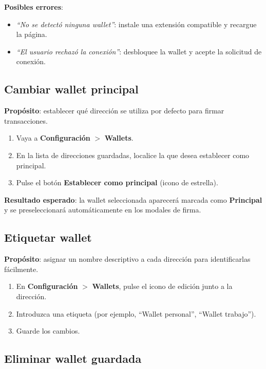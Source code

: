 \documentclass[11pt, a4paper]{article}
\begin{document}
\textbf{Posibles errores}:
\begin{itemize}
    \item \textit{``No se detect\'{o} ninguna wallet''}: instale una extensi\'{o}n compatible y recargue la p\'{a}gina.
    \item \textit{``El usuario rechaz\'{o} la conexi\'{o}n''}: desbloquee la wallet y acepte la solicitud de conexi\'{o}n.
\end{itemize}

\subsection{Cambiar wallet principal}

\textbf{Prop\'{o}sito}: establecer qu\'{e} direcci\'{o}n se utiliza por defecto para firmar transacciones.

\begin{enumerate}
    \item Vaya a \textbf{Configuraci\'{o}n} $>$ \textbf{Wallets}.
    \item En la lista de direcciones guardadas, localice la que desea establecer como principal.
    \item Pulse el bot\'{o}n \textbf{Establecer como principal} (icono de estrella).
\end{enumerate}

\textbf{Resultado esperado}: la wallet seleccionada aparecer\'{a} marcada como \textbf{Principal} y se preseleccionar\'{a} autom\'{a}ticamente en los modales de firma.

\subsection{Etiquetar wallet}

\textbf{Prop\'{o}sito}: asignar un nombre descriptivo a cada direcci\'{o}n para identificarlas f\'{a}cilmente.

\begin{enumerate}
    \item En \textbf{Configuraci\'{o}n} $>$ \textbf{Wallets}, pulse el icono de edici\'{o}n junto a la direcci\'{o}n.
    \item Introduzca una etiqueta (por ejemplo, ``Wallet personal'', ``Wallet trabajo'').
    \item Guarde los cambios.
\end{enumerate}

\subsection{Eliminar wallet guardada}
\end{document}
